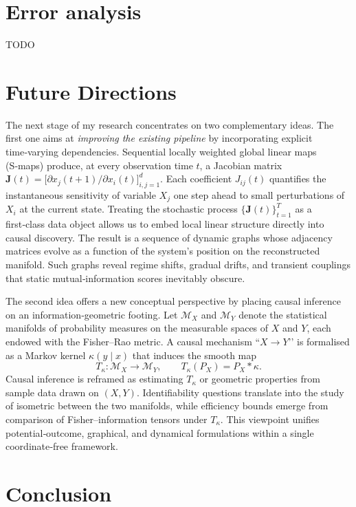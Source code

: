 \documentclass[14pt]{extarticle}
\begin{document}
	\section{Error analysis}
	TODO
	
	\section{Future Directions}\label{sec:future}
	
	The next stage of my research concentrates on two complementary ideas.  
	The first one aims at \emph{improving the existing pipeline} by incorporating explicit time‑varying dependencies.  
	Sequential locally weighted global linear maps (S‑maps) produce, at every observation time $t$, a Jacobian matrix $\mathbf J(t)=\bigl[\partial x_j(t+1)\!/\!\partial x_i(t)\bigr]_{i,j=1}^{d}$.  
	Each coefficient $J_{ij}(t)$ quantifies the instantaneous sensitivity of variable $X_j$ one step ahead to small perturbations of $X_i$ at the current state.  
	Treating the stochastic process $\{\mathbf J(t)\}_{t=1}^{T}$ as a first‑class data object allows us to embed local linear structure directly into causal discovery.   
	The result is a sequence of dynamic graphs whose adjacency matrices evolve as a function of the system’s position on the reconstructed manifold.  
	Such graphs reveal regime shifts, gradual drifts, and transient couplings that static mutual‑information scores inevitably obscure.  
	
	The second idea offers a new conceptual perspective by placing causal inference on an information‑geometric footing.  
	Let $\mathcal M_X$ and $\mathcal M_Y$ denote the statistical manifolds of probability measures on the measurable spaces of $X$ and $Y$, each endowed with the Fisher–Rao metric.  
	A causal mechanism “$X\!\rightarrow\!Y$’’ is formalised as a Markov kernel $\kappa(y\!\mid\!x)$ that induces the smooth map
	$$
	T_\kappa:\mathcal M_X\longrightarrow\mathcal M_Y,\qquad T_\kappa(P_X)=P_X\ast\kappa.
	$$
	Causal inference is reframed as estimating $T_\kappa$ or geometric properties from sample data drawn on $(X,Y)$.  
	Identifiability questions translate into the study of isometric between the two manifolds, while efficiency bounds emerge from comparison of Fisher–information tensors under $T_\kappa$.  
	This viewpoint unifies potential‑outcome, graphical, and dynamical formulations within a single coordinate‑free framework.  
	
	\section{Conclusion}\label{sec:conclusion}
	
\end{document}
